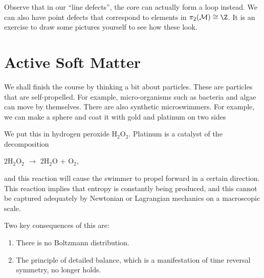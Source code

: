 \documentclass[a4paper]{article}
\begin{document}
Observe that in our ``line defects'', the core can actually form a loop instead. We can also have point defects that correspond to elements in $\pi_2(\mathcal{M}) \cong \Z$. It is an exercise to draw some pictures yourself to see how these look.

%
%
%
%

\section{Active Soft Matter}
We shall finish the course by thinking a bit about  particles. These are particles that are self-propelled. For example, micro-organisms such as bacteria and algae can move by themselves. There are also synthetic microswimmers. For example, we can make a sphere and coat it with gold and platinum on two sides
\begin{center}
\end{center}
We put this in hydrogen peroxide H$_2$O$_2$. Platinum is a catalyst of the decomposition
\begin{center}
  2H$_2$O$_2$ $\to$ 2H$_2$O + O$_2$,
\end{center}
and this reaction will cause the swimmer to propel forward in a certain direction. This reaction implies that entropy is constantly being produced, and this cannot be captured adequately by Newtonian or Lagrangian mechanics on a macroscopic scale.

Two key consequences of this are:
\begin{enumerate}
  \item There is no Boltzmann distribution.
  \item The principle of detailed balance, which is a manifestation of time reversal symmetry, no longer holds.
\end{enumerate}
\end{document}
